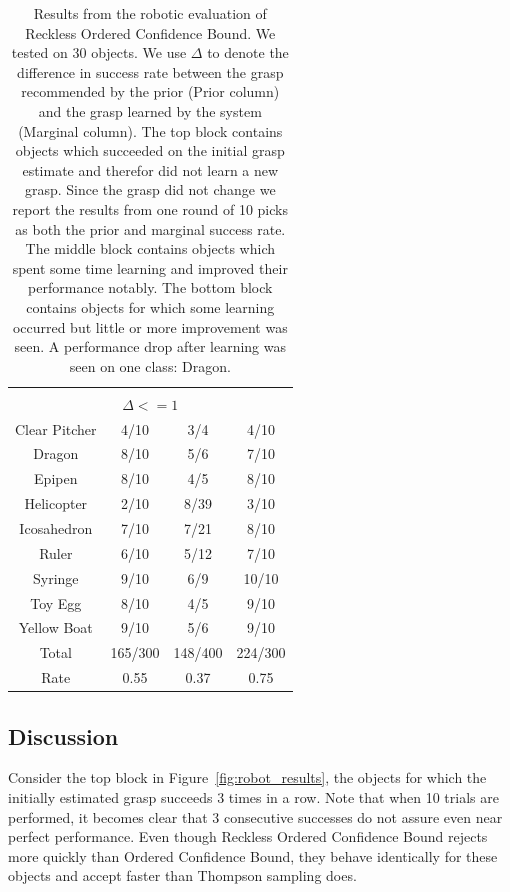 \documentclass{article}
\newcommand{\algorithmCTxt}{Ordered Confidence Bound\xspace}
\newcommand{\algorithmDTxt}{Reckless Ordered Confidence Bound\xspace}
\begin{document}
\begin{table}
\begin{tabular}{cccc}
\midrule
\\
\multicolumn{4}{c}{$\Delta <= 1$} \\
\midrule
Clear Pitcher       & 4/10          &  3/4         &  4/10 \\
Dragon    	    & 8/10          &  5/6         &  7/10 \\
Epipen    	    & 8/10          &  4/5         &  8/10 \\
Helicopter    	    & 2/10          &  8/39        &  3/10 \\
Icosahedron    	    & 7/10          &  7/21        &  8/10 \\
Ruler    	    & 6/10          &  5/12        &  7/10 \\
Syringe    	    & 9/10          &  6/9         &  10/10\\
Toy Egg    	    & 8/10          &  4/5         &  9/10 \\
Yellow Boat    	    & 9/10          &  5/6         &  9/10 \\
\midrule
Total		    & 165/300       &  148/400     & 224/300\\
Rate		    & 0.55          &  0.37        & 0.75\\
\bottomrule
\end{tabular}
\caption{Results from the robotic evaluation of \algorithmDTxt. We tested on 30 objects. We use
$\Delta$ to denote the difference in success rate between the grasp recommended
by the prior (Prior column) and the grasp learned by the system (Marginal
column). The top block contains objects which succeeded on the initial grasp
estimate and therefor did not learn a new grasp. Since the grasp did not change
we report the results from one round of 10 picks as both the prior and marginal
success rate.  The middle block contains objects which spent some time learning
and improved their performance notably. The bottom block contains objects for
which some learning occurred but little or more improvement was seen. A
performance drop after learning was seen on one class:
Dragon.\label{table:robot_results}}
\end{table}

\subsection{Discussion}
Consider the top block in Figure~\ref{fig:robot_results}, the objects for which the
initially estimated grasp succeeds 3 times in a row. Note that when 10 trials are performed,
it becomes clear that 3 consecutive successes do not assure even near perfect performance.
Even though \algorithmDTxt rejects more quickly than \algorithmCTxt, they behave identically
for these objects and accept faster than Thompson sampling does. 
\end{document}
